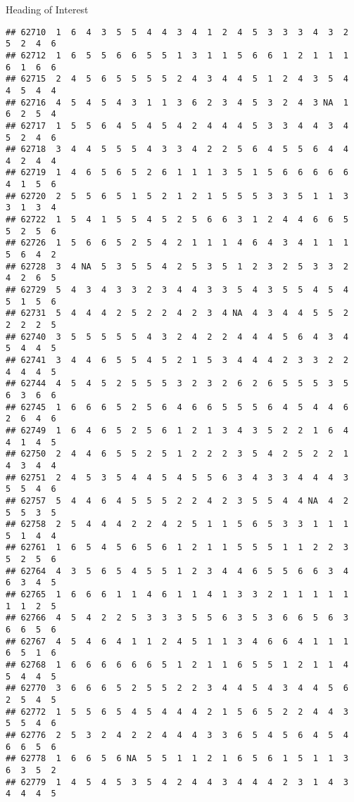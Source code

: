 \documentclass[
  ignorenonframetext,
]{beamer}
\begin{document}
\begin{frame}[fragile]{Heading of Interest}
\begin{verbatim}
## 62710  1  6  4  3  5  5  4  4  3  4  1  2  4  5  3  3  3  4  3  2  5  2  4  6
## 62712  1  6  5  5  6  6  5  5  1  3  1  1  5  6  6  1  2  1  1  1  6  1  6  6
## 62715  2  4  5  6  5  5  5  5  2  4  3  4  4  5  1  2  4  3  5  4  4  5  4  4
## 62716  4  5  4  5  4  3  1  1  3  6  2  3  4  5  3  2  4  3 NA  1  6  2  5  4
## 62717  1  5  5  6  4  5  4  5  4  2  4  4  4  5  3  3  4  4  3  4  5  2  4  6
## 62718  3  4  4  5  5  5  4  3  3  4  2  2  5  6  4  5  5  6  4  4  4  2  4  4
## 62719  1  4  6  5  6  5  2  6  1  1  1  3  5  1  5  6  6  6  6  6  4  1  5  6
## 62720  2  5  5  6  5  1  5  2  1  2  1  5  5  5  3  3  5  1  1  3  3  1  3  4
## 62722  1  5  4  1  5  5  4  5  2  5  6  6  3  1  2  4  4  6  6  5  5  2  5  6
## 62726  1  5  6  6  5  2  5  4  2  1  1  1  4  6  4  3  4  1  1  1  5  6  4  2
## 62728  3  4 NA  5  3  5  5  4  2  5  3  5  1  2  3  2  5  3  3  2  4  2  6  5
## 62729  5  4  3  4  3  3  2  3  4  4  3  3  5  4  3  5  5  4  5  4  5  1  5  6
## 62731  5  4  4  4  2  5  2  2  4  2  3  4 NA  4  3  4  4  5  5  2  2  2  2  5
## 62740  3  5  5  5  5  5  4  3  2  4  2  2  4  4  4  5  6  4  3  4  5  4  4  5
## 62741  3  4  4  6  5  5  4  5  2  1  5  3  4  4  4  2  3  3  2  2  4  4  4  5
## 62744  4  5  4  5  2  5  5  5  3  2  3  2  6  2  6  5  5  5  3  5  6  3  6  6
## 62745  1  6  6  6  5  2  5  6  4  6  6  5  5  5  6  4  5  4  4  6  2  6  4  6
## 62749  1  6  4  6  5  2  5  6  1  2  1  3  4  3  5  2  2  1  6  4  4  1  4  5
## 62750  2  4  4  6  5  5  2  5  1  2  2  2  3  5  4  2  5  2  2  1  4  3  4  4
## 62751  2  4  5  3  5  4  4  5  4  5  5  6  3  4  3  3  4  4  4  3  5  5  4  6
## 62757  5  4  4  6  4  5  5  5  2  2  4  2  3  5  5  4  4 NA  4  2  5  5  3  5
## 62758  2  5  4  4  4  2  2  4  2  5  1  1  5  6  5  3  3  1  1  1  5  1  4  4
## 62761  1  6  5  4  5  6  5  6  1  2  1  1  5  5  5  1  1  2  2  3  5  2  5  6
## 62764  4  3  5  6  5  4  5  5  1  2  3  4  4  6  5  5  6  6  3  4  6  3  4  5
## 62765  1  6  6  6  1  1  4  6  1  1  4  1  3  3  2  1  1  1  1  1  1  1  2  5
## 62766  4  5  4  2  2  5  3  3  3  5  5  6  3  5  3  6  6  5  6  3  6  6  5  6
## 62767  4  5  4  6  4  1  1  2  4  5  1  1  3  4  6  6  4  1  1  1  6  5  1  6
## 62768  1  6  6  6  6  6  6  5  1  2  1  1  6  5  5  1  2  1  1  4  5  4  4  5
## 62770  3  6  6  6  5  2  5  5  2  2  3  4  4  5  4  3  4  4  5  6  2  5  4  5
## 62772  1  5  5  6  5  4  5  4  4  4  2  1  5  6  5  2  2  4  4  3  5  5  4  6
## 62776  2  5  3  2  4  2  2  4  4  4  3  3  6  5  4  5  6  4  5  4  6  6  5  6
## 62778  1  6  6  5  6 NA  5  5  1  1  2  1  6  5  6  1  5  1  1  3  6  3  5  2
## 62779  1  4  5  4  5  3  5  4  2  4  4  3  4  4  4  2  3  1  4  3  4  4  4  5

\end{verbatim}
\end{frame}
\end{document}
